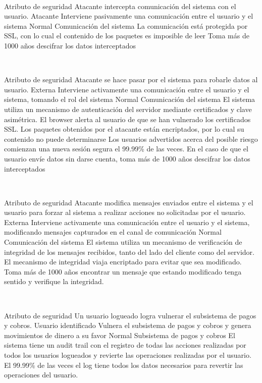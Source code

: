 ~

\escenario
{Atributo de seguridad}
{Atacante intercepta comunicación del sistema con el usuario.}
{Atacante}
{Interviene pasivamente una comunicación entre el usuario y el sistema}
{Normal}
{Comunicación del sistema}
{La comunicación está protegida por SSL, con lo cual el contenido de los paquetes es imposible de leer}
{Toma más de 1000 años descifrar los datos interceptados}


~

\escenario
{Atributo de seguridad}
{Atacante se hace pasar por el sistema para robarle datos al usuario.}
{Externa}
{Interviene activamente una comunicación entre el usuario y el sistema, tomando el rol del sistema}
{Normal}
{Comunicación del sistema}
{El sistema utiliza un mecanismo de autenticación del servidor mediante certificados y clave asimétrica. El browser alerta al usuario de que se han vulnerado los certificados SSL. Los paquetes obtenidos por el atacante están encriptados, por lo cual su contenido no puede determinarse}
{Los usuarios advertidos acerca del posible riesgo comienzan una nueva sesión segura el 99.99\% de las veces. En el caso de que el usuario envíe datos sin darse cuenta, toma más de 1000 años descifrar los datos interceptados}

~

\escenario
{Atributo de seguridad}
{Atacante modifica mensajes enviados entre el sistema y el usuario para forzar al sistema a realizar acciones no solicitadas por el usuario.}
{Externa}
{Interviene activamente una comunicación entre el usuario y el sistema, modificando mensajes capturados en el canal de comunicación}
{Normal}
{Comunicación del sistema}
{El sistema utiliza un mecanismo de verificación de integridad de los mensajes recibidos, tanto del lado del cliente como del servidor. El mecanismo de integridad viaja encriptado para evitar que sea modificado.}
{Toma más de 1000 años encontrar un mensaje que estando modificado tenga sentido y verifique la integridad.}

~

\escenario
{Atributo de seguridad}
{Un usuario logueado logra vulnerar el subsistema de pagos y cobros.}
{Usuario identificado}
{Vulnera el subsistema de pagos y cobros y genera movimientos de dinero a su favor}
{Normal}
{Subsistema de pagos y cobros}
{El sistema tiene un audit trail con el registro de todas las acciones realizadas por todos los usuarios logueados y revierte las operaciones realizadas por el usuario.}
{El 99.99\% de las veces el log tiene todos los datos necesarios para revertir las operaciones del usuario.}

